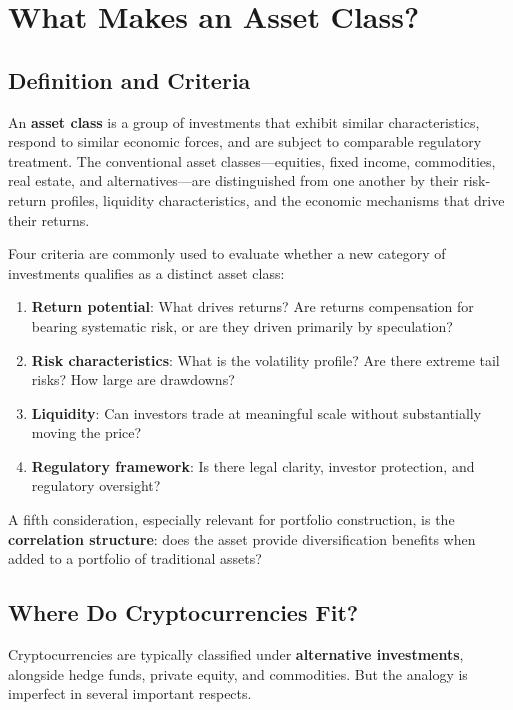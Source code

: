 \documentclass[11pt,a4paper]{article}
\newcommand{\keyword}[1]{\textbf{\textcolor{AccentOrange}{#1}}}
\begin{document}
\section{What Makes an Asset Class?}

\subsection{Definition and Criteria}

An \keyword{asset class} is a group of investments that exhibit similar characteristics, respond to similar economic forces, and are subject to comparable regulatory treatment. The conventional asset classes---equities, fixed income, commodities, real estate, and alternatives---are distinguished from one another by their risk-return profiles, liquidity characteristics, and the economic mechanisms that drive their returns.

Four criteria are commonly used to evaluate whether a new category of investments qualifies as a distinct asset class:

\begin{enumerate}
    \item \textbf{Return potential}: What drives returns? Are returns compensation for bearing systematic risk, or are they driven primarily by speculation?
    \item \textbf{Risk characteristics}: What is the volatility profile? Are there extreme tail risks? How large are drawdowns?
    \item \textbf{Liquidity}: Can investors trade at meaningful scale without substantially moving the price?
    \item \textbf{Regulatory framework}: Is there legal clarity, investor protection, and regulatory oversight?
\end{enumerate}

A fifth consideration, especially relevant for portfolio construction, is the \keyword{correlation structure}: does the asset provide diversification benefits when added to a portfolio of traditional assets?

\subsection{Where Do Cryptocurrencies Fit?}

Cryptocurrencies are typically classified under \keyword{alternative investments}, alongside hedge funds, private equity, and commodities. But the analogy is imperfect in several important respects.
\end{document}
